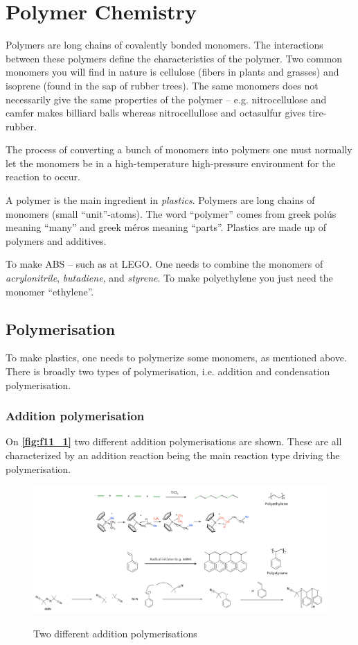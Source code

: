 
\section{Polymer Chemistry}
Polymers are long chains of covalently bonded monomers. The interactions between these polymers define the characteristics of the polymer. Two common monomers you will find in nature is cellulose (fibers in plants and grasses) and isoprene (found in the sap of rubber trees). The same monomers does not necessarily give the same properties of the polymer -- e.g. nitrocellulose and camfer makes billiard balls whereas nitrocellullose and octasulfur gives tire-rubber. 

The process of converting a bunch of monomers into polymers one must normally let the monomers be in a high-temperature high-pressure environment for the reaction to occur.

\begin{definition}[Polymer]
  A polymer is the main ingredient in \textit{plastics}. Polymers are long chains of monomers (small ``unit''-atoms). The word ``polymer'' comes from greek polús meaning ``many'' and greek méros meaning ``parts''. Plastics are made up of polymers and additives.
\end{definition}

To make ABS -- such as at LEGO. One needs to combine the monomers of \textit{acrylonitrile}, \textit{butadiene}, and \textit{styrene}. To make polyethylene you just need the monomer ``ethylene''.

\subsection{Polymerisation}
To make plastics, one needs to polymerize some monomers, as mentioned above. There is broadly two types of polymerisation, i.e. addition and condensation polymerisation. 

\subsubsection{Addition polymerisation}
On \textbf{\autoref{fig:f11_1}} two different addition polymerisations are shown. These are all characterized by an addition reaction being the main reaction type driving the polymerisation. 

\begin{figure} [ht]
  \centering
  \caption{Two different addition polymerisations}
  \includegraphics[width=0.75\linewidth]{./figures/f11_1.png}
  \label{fig:f11_1}
\end{figure}

